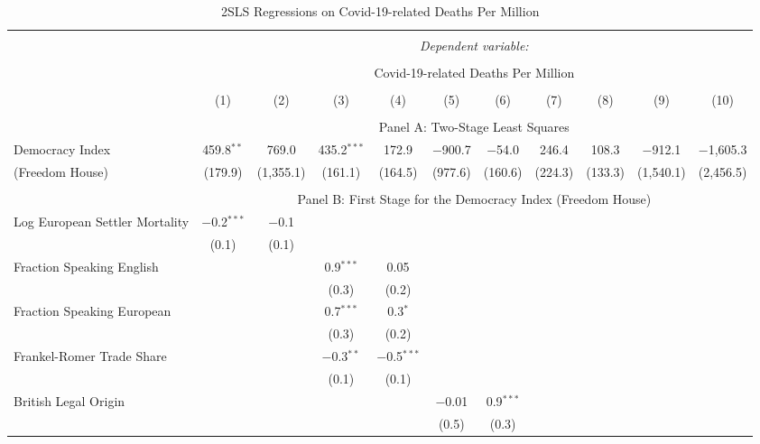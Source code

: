 
\begin{table}[!htbp] \centering
  \caption{2SLS Regressions on Covid-19-related Deaths Per Million}
  \label{tab:2sls-deaths-exclude-US-China} 
  \footnotesize
  \begin{threeparttable}
\begin{tabular}{@{\extracolsep{0pt}}lcccccccccc} 
\\[-1.8ex]\hline 
\hline \\[-1.8ex] 
 & \multicolumn{10}{c}{\textit{Dependent variable:}} \\ 
\cline{2-11} 
\\[-1.8ex] & \multicolumn{10}{c}{Covid-19-related Deaths Per Million} \\ 
\\[-1.8ex] & (1) & (2) & (3) & (4) & (5) & (6) & (7) & (8) & (9) & (10)\\ 
\hline \\[-1.8ex] 
  & \multicolumn{10}{c}{Panel A: Two-Stage Least Squares} \\
Democracy Index& 459.8$^{**}$ & 769.0 & 435.2$^{***}$ & 172.9 & $-$900.7 & $-$54.0 & 246.4 & 108.3 & $-$912.1 & $-$1,605.3 \\ 
 (Freedom House)   & (179.9) & (1,355.1) & (161.1) & (164.5) & (977.6) & (160.6) & (224.3) & (133.3) & (1,540.1) & (2,456.5) \\ 
\hline \\[-1.8ex] 
   & \multicolumn{10}{c}{Panel B: First Stage for the Democracy Index (Freedom House)} \\
  Log European Settler Mortality & $-$0.2$^{***}$ & $-$0.1 &  &  &  &  &  &  &  &  \\ 
  & (0.1) & (0.1) &  &  &  &  &  &  &  &  \\ 
  Fraction Speaking English &  &  & 0.9$^{***}$ & 0.05 &  &  &  &  &  &  \\ 
  &  &  & (0.3) & (0.2) &  &  &  &  &  &  \\ 
  Fraction Speaking European &  &  & 0.7$^{***}$ & 0.3$^{*}$ &  &  &  &  &  &  \\ 
  &  &  & (0.3) & (0.2) &  &  &  &  &  &  \\ 
  Frankel-Romer Trade Share &  &  & $-$0.3$^{**}$ & $-$0.5$^{***}$ &  &  &  &  &  &  \\ 
  &  &  & (0.1) & (0.1) &  &  &  &  &  &  \\ 
  British Legal Origin &  &  &  &  & $-$0.01 & 0.9$^{***}$ &  &  &  &  \\ 
  &  &  &  &  & (0.5) & (0.3) &  &  &  &  \\ 

\end{tabular}
\end{threeparttable}
\end{table}
